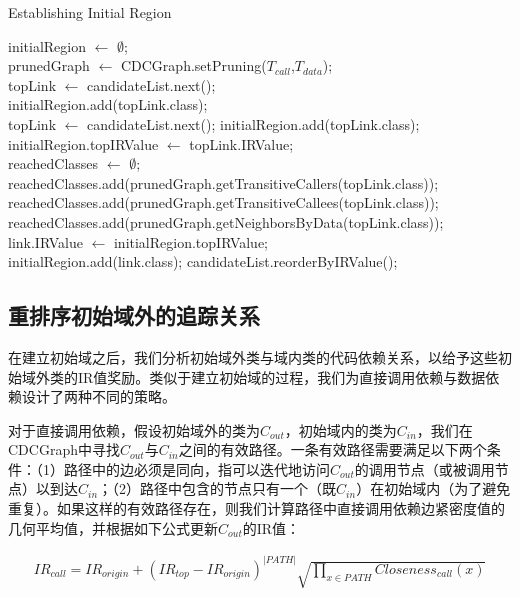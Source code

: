 \begin{algorithm}[htbp]
\caption{Establishing Initial Region}
\label{alg:EstablishingInitialRegion}
initialRegion $\leftarrow$ $\emptyset$;\\
prunedGraph $\leftarrow$ CDCGraph.setPruning($T_{call}$,$T_{data}$);\\
topLink $\leftarrow$ candidateList.next();\\
 {
  initialRegion.add(topLink.class);\\
  topLink $\leftarrow$ candidateList.next();
} 
initialRegion.add(topLink.class);\\
initialRegion.topIRValue $\leftarrow$ topLink.IRValue;\\
reachedClasses $\leftarrow$ $\emptyset$;\\
reachedClasses.add(prunedGraph.getTransitiveCallers(topLink.class));\\
reachedClasses.add(prunedGraph.getTransitiveCallees(topLink.class));\\
reachedClasses.add(prunedGraph.getNeighborsByData(topLink.class));\\
{
     {
      link.IRValue $\leftarrow$ initialRegion.topIRValue;\\
      initialRegion.add(link.class);
    }
}
candidateList.reorderByIRValue();\\
\end{algorithm}

\subsection{重排序初始域外的追踪关系}
在建立初始域之后，我们分析初始域外类与域内类的代码依赖关系，以给予这些初始域外类的IR值奖励。类似于建立初始域的过程，我们为直接调用依赖与数据依赖设计了两种不同的策略。

对于直接调用依赖，假设初始域外的类为$C_{out}$，初始域内的类为$C_{in}$，我们在CDCGraph中寻找$C_{out}$与$C_{in}$之间的有效路径。一条有效路径需要满足以下两个条件：（1）路径中的边必须是同向，指可以迭代地访问$C_{out}$的调用节点（或被调用节点）以到达$C_{in}$；（2）路径中包含的节点只有一个（既$C_{in}$）在初始域内（为了避免重复）。如果这样的有效路径存在，则我们计算路径中直接调用依赖边紧密度值的几何平均值，并根据如下公式更新$C_{out}$的IR值：

\begin{align}IR_{call}=IR_{origin}+(IR_{top}-IR_{origin})^{\left| PATH\right|}\sqrt {\prod _{x \in PATH}Closeness_{call}(x)} \end{align}

